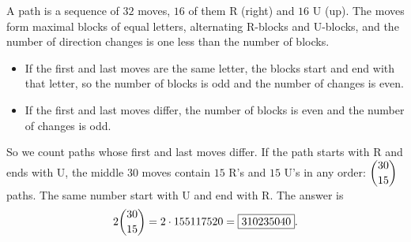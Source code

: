 A path is a sequence of $32$ moves, $16$ of them R (right) and $16$ U (up). The moves form maximal blocks of equal letters, alternating R-blocks and U-blocks, and the number of direction changes is one less than the number of blocks.
\begin{itemize}
\item If the first and last moves are the same letter, the blocks start and end with that letter, so the number of blocks is odd and the number of changes is even.
\item If the first and last moves differ, the number of blocks is even and the number of changes is odd.
\end{itemize}
So we count paths whose first and last moves differ. If the path starts with R and ends with U, the middle $30$ moves contain $15$ R's and $15$ U's in any order: $\dbinom{30}{15}$ paths. The same number start with U and end with R. The answer is
\[2\dbinom{30}{15}=2\cdot155117520=\boxed{310235040}.\]
